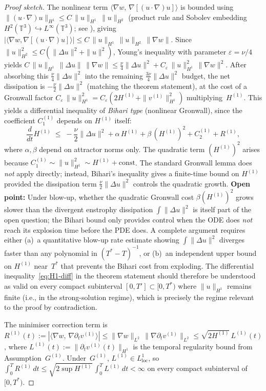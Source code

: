 \documentclass[12pt,a4paper]{article}
\theoremstyle{definition}
\theoremstyle{plain}
\theoremstyle{remark}
\begin{document}
\begin{proof}[Proof sketch]
The nonlinear term $\langle \nabla w,\, \nabla[(u\cdot\nabla)u]\rangle$
is bounded using
$\|(u\cdot\nabla)u\|_{H^1} \le C\,\|u\|_{H^1}\,\|u\|_{H^2}$
(product rule and Sobolev embedding $H^2(\mathbb{T}^3) \hookrightarrow
L^\infty(\mathbb{T}^3)$; see \cite{ConstantinFoias1988}), giving
$|\langle \nabla w, \nabla[(u\cdot\nabla)u]\rangle|
\le C\,\|u\|_{H^1}\,\|u\|_{H^2}\,\|\nabla w\|$.
Since $\|u\|_{H^2}^2 \le C(\|\Delta u\|^2 + \|u\|^2)$,
Young's inequality with parameter $\varepsilon = \nu/4$ yields
$C\,\|u\|_{H^1}\,\|\Delta u\|\,\|\nabla w\|
\le \frac{\nu}{4}\|\Delta u\|^2
+ C_\varepsilon\,\|u\|_{H^1}^2\,\|\nabla w\|^2$.
After absorbing this $\frac{\nu}{4}\|\Delta u\|^2$ into the remaining
$\frac{3\nu}{4}\|\Delta u\|^2$ budget, the net dissipation is
$-\frac{\nu}{2}\|\Delta u\|^2$ (matching the theorem statement),
at the cost of a Gronwall factor
$C_\varepsilon\,\|u\|_{H^1}^2 = C_\varepsilon(2H^{(1)}
+ \|v^{(1)}\|_{H^1}^2)$ multiplying~$H^{(1)}$.
This yields a differential inequality of \emph{Bihari type}
(nonlinear Gronwall), since the coefficient $C_1^{(1)}$ depends
on $H^{(1)}$ itself:
\[
  \frac{d}{dt}H^{(1)}
  \;\le\;
  -\frac{\nu}{2}\|\Delta u\|^2
  + \alpha\,H^{(1)}
  + \beta\,(H^{(1)})^2
  + C_2^{(1)}
  + R^{(1)},
\]
where $\alpha, \beta$ depend on attractor norms only.
The quadratic term $(H^{(1)})^2$ arises because
$C_1^{(1)} \sim \|u\|_{H^1}^2 \sim H^{(1)} + \mathrm{const}$.
The standard Gronwall lemma does \emph{not} apply directly;
instead, Bihari's inequality gives a finite-time bound on $H^{(1)}$
provided the dissipation term $\frac{\nu}{2}\|\Delta u\|^2$
controls the quadratic growth.
\textbf{Open point:} Under blow-up, whether the quadratic Gronwall cost
$\beta(H^{(1)})^2$ grows slower than the divergent enstrophy
dissipation $\int\|\Delta u\|^2$ is itself part of the open question;
the Bihari bound only provides control when the ODE does \emph{not}
reach its explosion time before the PDE does.  A complete argument
requires either (a)~a quantitative blow-up rate estimate showing
$\int\|\Delta u\|^2$ diverges faster than any polynomial in
$(T^*-T)^{-1}$, or (b)~an independent upper bound on $H^{(1)}$
near~$T^*$ that prevents the Bihari cost from exploding.
The differential inequality~\eqref{eq:H1-diff} in the theorem
statement should therefore be understood as valid on every
compact subinterval $[0,T'] \subset [0,T^*)$ where
$\|u\|_{H^1}$ remains finite (i.e., in the strong-solution regime),
which is precisely the regime relevant to the proof by contradiction.

The minimiser correction term is
$R^{(1)}(t) := |\langle \nabla w,\,
\nabla\partial_t v^{(1)}\rangle|
\le \|\nabla w\|_{L^2}\,\|\nabla\partial_t v^{(1)}\|_{L^2}
\le \sqrt{2H^{(1)}}\,L^{(1)}(t)$,
where $L^{(1)}(t) := \|\partial_t v^{(1)}(t)\|_{H^1}$ is the
temporal regularity bound from Assumption~$G^{(1)}$.
Under~$G^{(1)}$, $L^{(1)} \in L^1_{\mathrm{loc}}$, so
$\int_0^T R^{(1)}\,dt
\le \sqrt{2\sup H^{(1)}}\,\int_0^T L^{(1)}\,dt < \infty$
on every compact subinterval of~$[0,T^*)$.
\end{proof}
\end{document}
